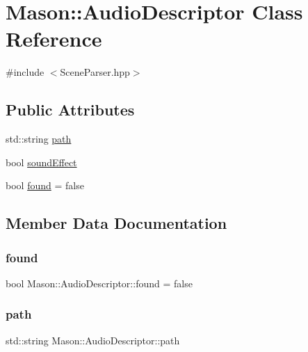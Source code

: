 \hypertarget{class_mason_1_1_audio_descriptor}{}\section{Mason\+:\+:Audio\+Descriptor Class Reference}
\label{class_mason_1_1_audio_descriptor}


{\ttfamily \#include $<$Scene\+Parser.\+hpp$>$}

\subsection*{Public Attributes}
\begin{DoxyCompactItemize}
\item 
std\+::string \hyperlink{class_mason_1_1_audio_descriptor_a48908da92ad467deffccb4d8340aea20}{path}
\item 
bool \hyperlink{class_mason_1_1_audio_descriptor_a860c5957f7c0d3967399f05eb4555554}{sound\+Effect}
\item 
bool \hyperlink{class_mason_1_1_audio_descriptor_ab49d1cfecfbd13d161f1bad522bd3294}{found} = false
\end{DoxyCompactItemize}


\subsection{Member Data Documentation}
\hypertarget{class_mason_1_1_audio_descriptor_ab49d1cfecfbd13d161f1bad522bd3294}{}\label{class_mason_1_1_audio_descriptor_ab49d1cfecfbd13d161f1bad522bd3294} 
\subsubsection{\texorpdfstring{found}{found}}
{\footnotesize\ttfamily bool Mason\+::\+Audio\+Descriptor\+::found = false}

\hypertarget{class_mason_1_1_audio_descriptor_a48908da92ad467deffccb4d8340aea20}{}\label{class_mason_1_1_audio_descriptor_a48908da92ad467deffccb4d8340aea20} 
\subsubsection{\texorpdfstring{path}{path}}
{\footnotesize\ttfamily std\+::string Mason\+::\+Audio\+Descriptor\+::path}


